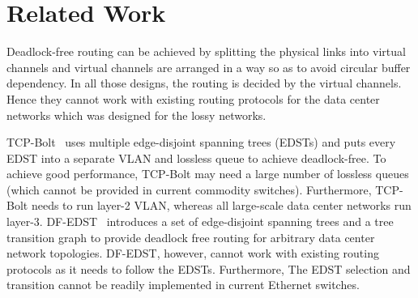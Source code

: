 \section{Related Work}\label{sec:related}




Deadlock-free routing \cite{dally,duato93,dally93,sancho2004,flich2012survey,lash,wu2003fault,glass,duato2001,domke2011,puente1999} can be achieved by splitting the physical links into virtual channels and virtual channels are arranged in a way so as to avoid circular buffer dependency. In all those designs, the routing is decided by the virtual channels. Hence they cannot work with existing routing protocols for the data center networks which was designed for the lossy networks.

TCP-Bolt~\cite{tcpbolt} uses multiple edge-disjoint spanning trees (EDSTs) and puts every EDST into a separate VLAN and lossless queue to achieve deadlock-free. To achieve good performance, TCP-Bolt may need a large number of lossless queues (which cannot be provided in current commodity switches). Furthermore, TCP-Bolt needs to run layer-2 VLAN, whereas all large-scale data center networks run layer-3. 
DF-EDST~\cite{dfedst16} introduces a set of edge-disjoint spanning trees and a tree transition graph to provide deadlock free routing for arbitrary data center network topologies. DF-EDST, however, cannot work with existing routing protocols as it needs to follow the EDSTs. Furthermore, The EDST selection and transition cannot be readily implemented in current Ethernet switches.

